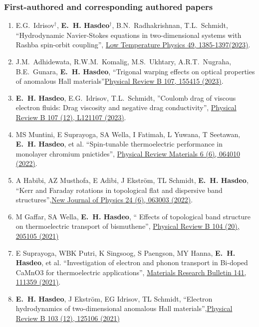 \documentclass[a4paper,11pt]{article}
\def\hes{{\bf E.~H. Hasdeo}}
\begin{document}
\subsubsection*{First-authored and corresponding authored papers}
\begin{enumerate}
\item E.G.~Idrisov$^\dagger$, \hes$^\dagger$, B.N.~Radhakrishnan, T.L.~Schmidt, ``Hydrodynamic Navier-Stokes equations in two-dimensional systems with Rashba spin-orbit coupling'', \href{https://doi.org/10.1063/10.0022364}{Low Temperature Physics 49, 1385-1397(2023)}.
\item J.M.~Adhidewata, R.W.M.~Komalig, M.S.~Ukhtary, A.R.T.~Nugraha, B.E.~Gunara, \hes, ``Trigonal warping effects on optical properties of anomalous Hall materials''\href{https://doi.org/10.1103/PhysRevB.107.155415}{Physical Review B 107, 155415 (2023)}.
\item \hes, E.G.~Idrisov, T.L.~Schmidt, ''Coulomb drag of viscous electron fluids: Drag viscosity and negative drag conductivity'', \href{https://doi.org/10.1103/PhysRevB.107.L121107}{Physical Review B 107 (12), L121107 (2023)}.
\item MS Muntini, E Suprayoga, SA Wella, I Fatimah, L Yuwana, T Seetawan, \hes, et al. ``Spin-tunable thermoelectric performance in monolayer chromium pnictides'', \href{https://doi.org/10.1103/PhysRevMaterials.6.064010}{Physical Review Materials 6 (6), 064010 (2022)}.
\item A Habibi, AZ Musthofa, E Adibi, J Ekström, TL Schmidt, \hes, ``Kerr and Faraday rotations in topological flat and dispersive band structures'',\href{https://iopscience.iop.org/article/10.1088/1367-2630/ac706d/meta}{New Journal of Physics 24 (6), 063003 (2022)}.
\item M Gaffar, SA Wella, \hes, `` Effects of topological band structure on thermoelectric transport of bismuthene'', \href{https://journals.aps.org/prb/abstract/10.1103/PhysRevB.104.205105}{Physical Review B 104 (20), 205105 (2021)}
\item E Suprayoga, WBK Putri, K Singsoog, S Paengson, MY Hanna, \hes, et al. ``Investigation of electron and phonon transport in Bi-doped CaMnO3 for thermoelectric applications'', \href{https://doi.org/10.1016/j.materresbull.2021.111359}{Materials Research Bulletin 141, 111359 (2021)}.
  \item \hes, J Ekström, EG Idrisov, TL Schmidt, ``Electron hydrodynamics of two-dimensional anomalous Hall materials'',\href{https://doi.org/10.1103/PhysRevB.103.125106}{Physical Review B 103 (12), 125106 (2021)}

\end{enumerate}
\end{document}
